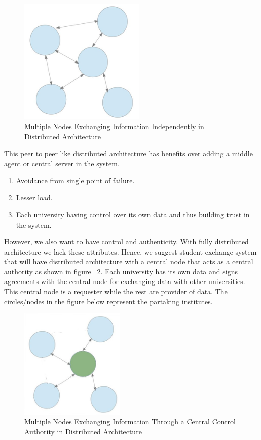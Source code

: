 \documentclass[12pt,a4paper,oneside]{book}
\begin{document}
\begin{figure}[!htp]
  \centering
  \includegraphics[width=6cm]{architecture_distributed_independent_exchange.png}
  \caption{Multiple Nodes Exchanging Information Independently in Distributed Architecture \cite{The Mobility Project}}
  \label{fig:architecture_distributed_independent_exchange}
\end{figure}

This peer to peer like distributed architecture has benefits over adding a middle agent or central server in the system.

\begin{enumerate}
\item Avoidance from single point of failure.
\item Lesser load.
\item Each university having control over its own data and thus building trust in the system.	
\end{enumerate}

However, we also want to have control and authenticity. With fully distributed architecture we lack these attributes. Hence, we suggest student exchange system that will have distributed architecture with a central node that acts as a central authority as shown in figure ~\ref{fig:architecture_distributed_exchange_through_hec}. Each university has its own data and signs agreements with the central node for exchanging data with other universities. This central node is a requester while the rest are provider of data. The circles/nodes in the figure below represent the partaking institutes. \\

\begin{figure}[!htp]
  \centering
  \includegraphics[width=5cm]{architecture_distributed_exchange_through_hec.png}
  \caption{Multiple Nodes Exchanging Information Through a Central Control Authority in Distributed Architecture}
  \label{fig:architecture_distributed_exchange_through_hec}
\end{figure}
\end{document}
